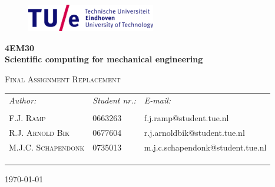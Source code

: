 
\begin{titlepage}

\begin{center}

\begin{figure}[h!]
    \parbox [t]{\textwidth}
        {
        \center
        \includegraphics[width=0.5\textwidth]{Logos/TUe.png}
        }
\end{figure}

\vspace{10 mm}

\textbf{\huge {\bf 4EM30}}\\[0.9cm]



{ \huge \bfseries  Scientific computing for mechanical engineering }\\[0.4cm]


\vspace{20 mm}

\textsc{\huge Final Assignment Replacement}\\[0.9cm]

\vspace{30 mm}

\begin{center}
    \begin{tabular}{ l l l }
	\emph{Author:}			& \emph{Student nr.:}	& \emph{E-mail:}		\\
	\\	
	F.J. \textsc{Ramp}	 & 0663263 & f.j.ramp@student.tue.nl\\
	R.J. \textsc{Arnold Bik}	 & 0677604 & r.j.arnoldbik@student.tue.nl\\
	M.J.C. \textsc{Schapendonk}	 & 0735013 & m.j.c.schapendonk@student.tue.nl\\
	
	\\
	\\\\
    \end{tabular}
    \end{center}


\vfill

{\large \today} \\

\end{center}

\end{titlepage} 